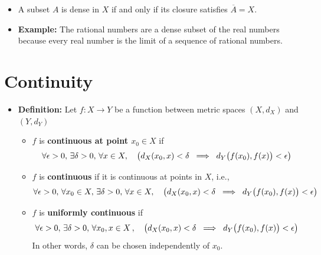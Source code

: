 \documentclass[11pt,twoside]{report}
\begin{document}
\begin{itemize}
\item A subset $A$ is dense in $X$ if and only if its closure satisfies $\overline{A}=X$.


\item \textbf{Example:}
The rational numbers are a dense subset of the real numbers because every real number is the limit of a sequence of rational numbers.




\end{itemize}



\section{Continuity} 
\begin{itemize}


\item \textbf{Definition:} Let $f \colon X \to Y$ be a function between metric spaces $(X, d_X)$ and $(Y,d_Y)$

\begin{itemize}

\item  $f$ is \textbf{continuous at point  $x_0 \in X$} if %
\[
\forall \epsilon > 0,   \, \exists \delta > 0,  \,  \forall x \in X ,  \quad \big( d_X(x_0,x) < \delta \; \implies \;   d_Y\big( f(x_0) , f(x) \big)  < \epsilon \big)
\]

\item   $f$ is \textbf{continuous} if it is continuous at points in $X$, i.e., 
\[
 \forall \epsilon > 0,   \, \forall x_0 \in X, \, \exists \delta > 0,  \,  \forall x \in X ,  \quad \big( d_X(x_0,x) < \delta \; \implies \;   d_Y\big( f(x_0) , f(x) \big)  < \epsilon \big)
\]


\item   $f$ is \textbf{uniformly continuous} if
\[
\forall \epsilon > 0,  \, \exists \delta > 0,  \, \forall x_0, x  \in X\,  ,  \quad \big( d_X(x_0,x) < \delta \; \implies \;   d_Y\big( f(x_0) , f(x) \big)  < \epsilon \big)
\]
In other words, $\delta$ can be chosen independently of $x_0$.


\end{itemize}
\end{itemize}
\end{document}
